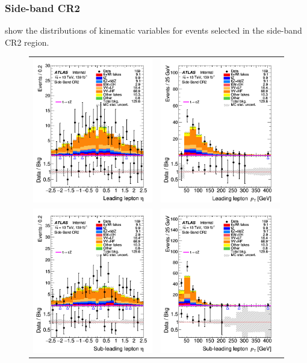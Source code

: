 \clearpage
\FloatBarrier
\subsubsection{Side-band CR2}
 show the distributions 
of kinematic variables for events selected in the side-band CR2 region.

\begin{figure}[!htbp]
	\centering
	\begin{tabular}{cc}
		\includegraphics[width=.32\textwidth]{Chapters/CH7/figures/SBCR2/lep1_eta} &
		\includegraphics[width=.32\textwidth]{Chapters/CH7/figures/SBCR2/lep1_pt} \\
		\includegraphics[width=.32\textwidth]{Chapters/CH7/figures/SBCR2/lep2_eta} &
		\includegraphics[width=.32\textwidth]{Chapters/CH7/figures/SBCR2/lep2_pt} \\

\end{tabular}
\end{figure}
